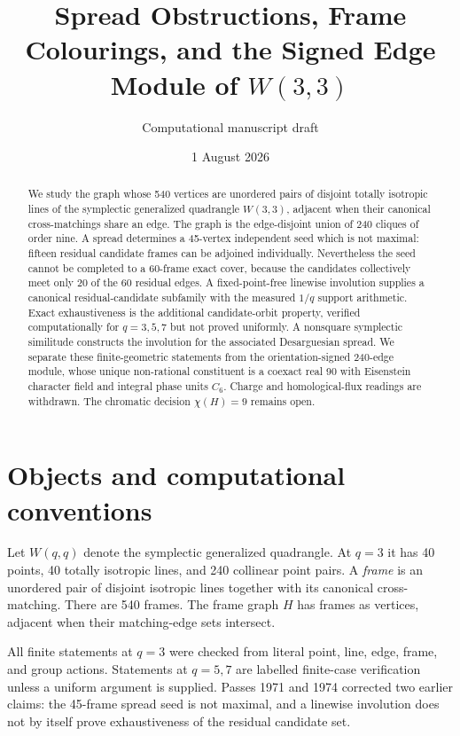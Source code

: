 \documentclass[11pt]{article}
\title{Spread Obstructions, Frame Colourings, and the Signed Edge Module of \(W(3,3)\)}
\author{Computational manuscript draft}
\date{1 August 2026}
\begin{document}
\maketitle

\begin{abstract}
We study the graph whose 540 vertices are unordered pairs of disjoint totally
isotropic lines of the symplectic generalized quadrangle \(W(3,3)\), adjacent
when their canonical cross-matchings share an edge. The graph is the
edge-disjoint union of 240 cliques of order nine. A spread determines a
45-vertex independent seed which is not maximal: fifteen residual candidate
frames can be adjoined individually. Nevertheless the seed cannot be completed
to a 60-frame exact cover, because the candidates collectively meet only 20 of
the 60 residual edges. A fixed-point-free linewise involution supplies a
canonical residual-candidate subfamily with the measured \(1/q\) support
arithmetic. Exact exhaustiveness is the additional candidate-orbit property,
verified computationally for \(q=3,5,7\) but not proved uniformly. A nonsquare
symplectic similitude constructs the involution for the associated Desarguesian
spread. We separate these finite-geometric statements from the orientation-signed
240-edge module, whose unique non-rational constituent is a coexact real 90 with
Eisenstein character field and integral phase units \(C_6\). Charge and
homological-flux readings are withdrawn. The chromatic decision
\(\chi(H)=9\) remains open.
\end{abstract}

\section{Objects and computational conventions}
Let \(W(q,q)\) denote the symplectic generalized quadrangle. At \(q=3\) it has
40 points, 40 totally isotropic lines, and 240 collinear point pairs. A
\emph{frame} is an unordered pair of disjoint isotropic lines together with its
canonical cross-matching. There are 540 frames. The frame graph \(H\) has frames
as vertices, adjacent when their matching-edge sets intersect.

All finite statements at \(q=3\) were checked from literal point, line, edge,
frame, and group actions. Statements at \(q=5,7\) are labelled finite-case
verification unless a uniform argument is supplied. Passes 1971 and 1974
corrected two earlier claims: the 45-frame spread seed is not maximal, and a
linewise involution does not by itself prove exhaustiveness of the residual
candidate set.
\end{document}

